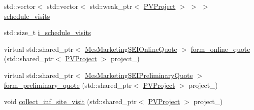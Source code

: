 \begin{DoxyCompactItemize}
\item 
std\+::vector$<$ std\+::vector$<$ std\+::weak\+\_\+ptr$<$ \hyperlink{classsolar__core_1_1_p_v_project}{P\+V\+Project} $>$ $>$ $>$ \hyperlink{classsolar__core_1_1_s_e_i_a8729d1aaf89da5d7d8b52761b65c881c}{schedule\+\_\+visits}
\item 
std\+::size\+\_\+t \hyperlink{classsolar__core_1_1_s_e_i_a3ff238346bd126ee39aa37bfee41be43}{i\+\_\+schedule\+\_\+visits}
\item 
virtual std\+::shared\+\_\+ptr$<$ \hyperlink{classsolar__core_1_1_mes_marketing_s_e_i_online_quote}{Mes\+Marketing\+S\+E\+I\+Online\+Quote} $>$ \hyperlink{classsolar__core_1_1_s_e_i_ad532ca9d30d5988e051b75e33ce6c241}{form\+\_\+online\+\_\+quote} (std\+::shared\+\_\+ptr$<$ \hyperlink{classsolar__core_1_1_p_v_project}{P\+V\+Project} $>$ project\+\_\+)
\item 
virtual std\+::shared\+\_\+ptr$<$ \hyperlink{classsolar__core_1_1_mes_marketing_s_e_i_preliminary_quote}{Mes\+Marketing\+S\+E\+I\+Preliminary\+Quote} $>$ \hyperlink{classsolar__core_1_1_s_e_i_af598032ee3e4506cf5123aceee67cbfd}{form\+\_\+preliminary\+\_\+quote} (std\+::shared\+\_\+ptr$<$ \hyperlink{classsolar__core_1_1_p_v_project}{P\+V\+Project} $>$ project\+\_\+)
\item 
void \hyperlink{classsolar__core_1_1_s_e_i_abdcbd57fa145ee55eb8455a8bc3b4c7c}{collect\+\_\+inf\+\_\+site\+\_\+visit} (std\+::shared\+\_\+ptr$<$ \hyperlink{classsolar__core_1_1_p_v_project}{P\+V\+Project} $>$ project\+\_\+)
\end{DoxyCompactItemize}
